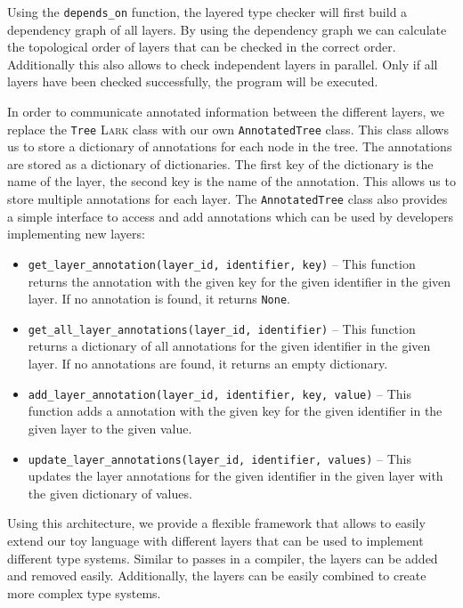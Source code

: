 \documentclass[acmsmall, review, screen]{acmart}
\newcommand{\Lark}[0]{\textsc{Lark}}
\begin{document}
Using the \texttt{depends\_on} function, the layered type checker will first build a dependency graph of all layers. By using the dependency graph we can calculate the topological order of layers that can be checked in the correct order. Additionally this also allows to check independent layers in parallel. Only if all layers have been checked successfully, the program will be executed.

In order to communicate annotated information between the different layers, we replace the \texttt{Tree} \Lark{} class with our own \texttt{AnnotatedTree} class. This class allows us to store a dictionary of annotations for each node in the tree. The annotations are stored as a dictionary of dictionaries. The first key of the dictionary is the name of the layer, the second key is the name of the annotation. This allows us to store multiple annotations for each layer. The \texttt{AnnotatedTree} class also provides a simple interface to access and add annotations which can be used by developers implementing new layers:

\begin{itemize}
	\item \texttt{get\_layer\_annotation(layer\_id, identifier, key)} -- This function returns the annotation with the given key for the given identifier in the given layer. If no annotation is found, it returns \texttt{None}.
	\item \texttt{get\_all\_layer\_annotations(layer\_id, identifier)} -- This function returns a dictionary of all annotations for the given identifier in the given layer. If no annotations are found, it returns an empty dictionary.
	\item \texttt{add\_layer\_annotation(layer\_id, identifier, key, value)} -- This function adds a annotation with the given key for the given identifier in the given layer to the given value.
	\item \texttt{update\_layer\_annotations(layer\_id, identifier, values)} -- This updates the layer annotations for the given identifier in the given layer with the given dictionary of values.
\end{itemize}

Using this architecture, we provide a flexible framework that allows to easily extend our toy language with different layers that can be used to implement different type systems. Similar to passes in a compiler, the layers can be added and removed easily. Additionally, the layers can be easily combined to create more complex type systems.
\end{document}
